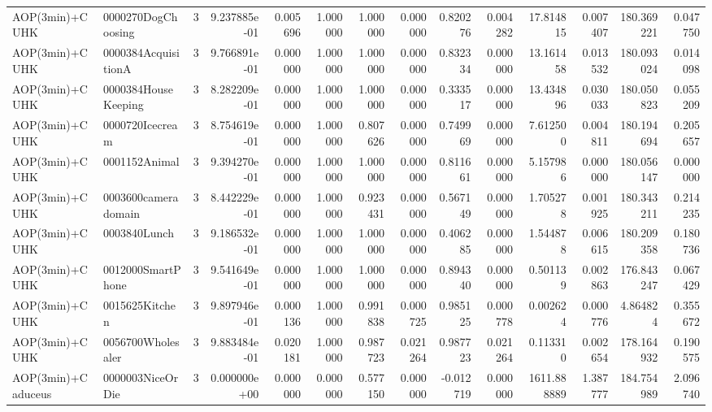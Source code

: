 \begin{tabular}{llrr|r|rr|rr|rr|rrr}
           AOP(3min)+CUHK &     0000270DogChoosing &       3 & 9.237885e-01 & 0.005696 & 1.000000 &      1.000000 & 0.000000 &      0.820276 & 0.004282 &     17.814815 &    0.007407 &   180.369221 &    0.047750 \\
           AOP(3min)+CUHK &    0000384AcquisitionA &       3 & 9.766891e-01 & 0.000000 & 1.000000 &      1.000000 & 0.000000 &      0.832334 & 0.000000 &     13.161458 &    0.013532 &   180.093024 &    0.014098 \\
           AOP(3min)+CUHK &    0000384HouseKeeping &       3 & 8.282209e-01 & 0.000000 & 1.000000 &      1.000000 & 0.000000 &      0.333517 & 0.000000 &     13.434896 &    0.030033 &   180.050823 &    0.055209 \\
           AOP(3min)+CUHK &        0000720Icecream &       3 & 8.754619e-01 & 0.000000 & 1.000000 &      0.807626 & 0.000000 &      0.749969 & 0.000000 &      7.612500 &    0.004811 &   180.194694 &    0.205657 \\
           AOP(3min)+CUHK &          0001152Animal &       3 & 9.394270e-01 & 0.000000 & 1.000000 &      1.000000 & 0.000000 &      0.811661 & 0.000000 &      5.157986 &    0.000000 &   180.056147 &    0.000000 \\
           AOP(3min)+CUHK &    0003600cameradomain &       3 & 8.442229e-01 & 0.000000 & 1.000000 &      0.923431 & 0.000000 &      0.567149 & 0.000000 &      1.705278 &    0.001925 &   180.343211 &    0.214235 \\
           AOP(3min)+CUHK &           0003840Lunch &       3 & 9.186532e-01 & 0.000000 & 1.000000 &      1.000000 & 0.000000 &      0.406285 & 0.000000 &      1.544878 &    0.006615 &   180.209358 &    0.180736 \\
           AOP(3min)+CUHK &      0012000SmartPhone &       3 & 9.541649e-01 & 0.000000 & 1.000000 &      1.000000 & 0.000000 &      0.894340 & 0.000000 &      0.501139 &    0.002863 &   176.843247 &    0.067429 \\
           AOP(3min)+CUHK &         0015625Kitchen &       3 & 9.897946e-01 & 0.000136 & 1.000000 &      0.991838 & 0.000725 &      0.985125 & 0.000778 &      0.002624 &    0.000776 &     4.864824 &    0.355672 \\
           AOP(3min)+CUHK &      0056700Wholesaler &       3 & 9.883484e-01 & 0.020181 & 1.000000 &      0.987723 & 0.021264 &      0.987723 & 0.021264 &      0.113310 &    0.002654 &   178.164932 &    0.190575 \\
       AOP(3min)+Caduceus &       0000003NiceOrDie &       3 & 0.000000e+00 & 0.000000 & 0.000000 &      0.577150 & 0.000000 &     -0.012719 & 0.000000 &   1611.888889 &    1.387777 &   184.754989 &    2.096740 \\

\end{tabular}
